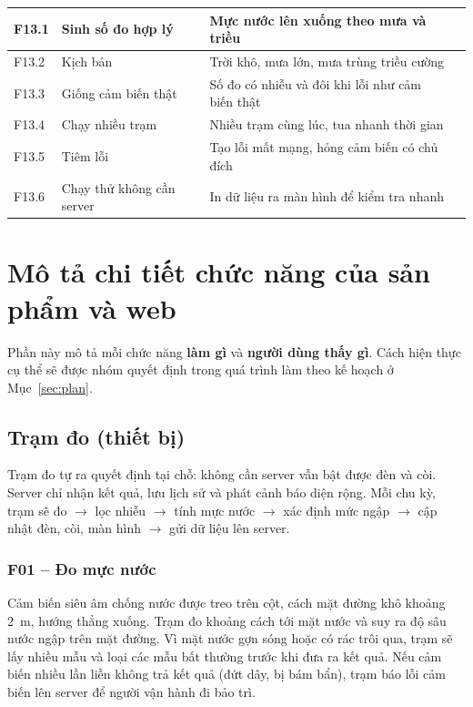 \documentclass[12pt,a4paper]{article}
\begin{document}
\begin{longtable}{|C{1.25cm}|L{4.1cm}|L{7.6cm}|C{1.1cm}|}
F13.1 & Sinh số đo hợp lý & Mực nước lên xuống theo mưa và triều & \\ \hline
F13.2 & Kịch bản & Trời khô, mưa lớn, mưa trùng triều cường & \\ \hline
F13.3 & Giống cảm biến thật & Số đo có nhiễu và đôi khi lỗi như cảm biến thật & \\ \hline
F13.4 & Chạy nhiều trạm & Nhiều trạm cùng lúc, tua nhanh thời gian & \\ \hline
F13.5 & Tiêm lỗi & Tạo lỗi mất mạng, hỏng cảm biến có chủ đích & \\ \hline
F13.6 & Chạy thử không cần server & In dữ liệu ra màn hình để kiểm tra nhanh & \\
\end{longtable}

\section{Mô tả chi tiết chức năng của sản phẩm và web}

Phần này mô tả mỗi chức năng \textbf{làm gì} và \textbf{người dùng thấy gì}. Cách hiện thực cụ thể sẽ được nhóm quyết định trong quá trình làm theo kế hoạch ở Mục~\ref{sec:plan}.

\subsection{Trạm đo (thiết bị)}

Trạm đo tự ra quyết định tại chỗ: không cần server vẫn bật được đèn và còi. Server chỉ nhận kết quả, lưu lịch sử và phát cảnh báo diện rộng. Mỗi chu kỳ, trạm sẽ đo $\rightarrow$ lọc nhiễu $\rightarrow$ tính mực nước $\rightarrow$ xác định mức ngập $\rightarrow$ cập nhật đèn, còi, màn hình $\rightarrow$ gửi dữ liệu lên server.

\subsubsection{F01 -- Đo mực nước}\label{sec:f01}
Cảm biến siêu âm chống nước được treo trên cột, cách mặt đường khô khoảng 2~m, hướng thẳng xuống. Trạm đo khoảng cách tới mặt nước và suy ra độ sâu nước ngập trên mặt đường. Vì mặt nước gợn sóng hoặc có rác trôi qua, trạm sẽ lấy nhiều mẫu và loại các mẫu bất thường trước khi đưa ra kết quả. Nếu cảm biến nhiều lần liền không trả kết quả (đứt dây, bị bám bẩn), trạm báo lỗi cảm biến lên server để người vận hành đi bảo trì.
\end{document}
